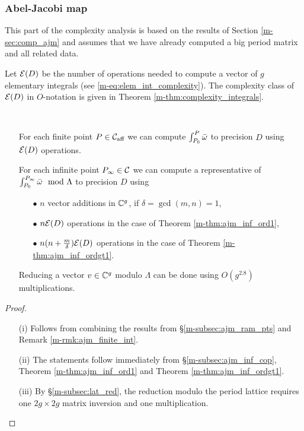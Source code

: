 \documentclass[main.tex]{subfiles}
\begin{document}
   \subsubsection{Abel-Jacobi map}

  This part of the complexity analysis is based on the results of Section \ref{m-sec:comp_ajm} and assumes that we have already computed a big period matrix and all related data.

  Let $\mathcal E(D)$ be the number of operations needed to compute a vector of $g$ elementary integrals  (see \eqref{m-eq:elem_int_complexity}). The complexity class of $\mathcal E(D)$ in $O$-notation is given in
  Theorem \ref{m-thm:complexity_integrals}.

   \begin{thm} \
   \begin{itemize}
     \item[{\upshape{(i)}}] For each finite point $P \in \mathcal{C}_{\text{aff}}$ we can compute $\int_{P_0}^P \bar{\omega}$ to precision $D$ using
      $\mathcal E(D)$ operations.
     \item[{\upshape{(ii)}}] For each infinite point $P_{\infty} \in \mathcal{C}$ we can compute a representative of $\int_{P_0}^{P_{\infty}} \bar{\omega} \mod \Lambda$ to precision $D$ using
      \begin{itemize}
       \item[$\bullet$] $n$ vector additions in $\mathbb{C}^g$, if $\delta = \gcd(m,n) = 1$,
       \item[$\bullet$] $n \mathcal E(D)$ operations in the case of Theorem \ref{m-thm:ajm_inf_ord1},
       \item[$\bullet$] $n(n+\frac{m}\delta)\mathcal E(D)$ operations  in the case of Theorem \ref{m-thm:ajm_inf_ordgt1}.
      \end{itemize}
      \item[{\upshape{(iii)}}] Reducing a vector $v \in \mathbb{C}^g$ modulo $\Lambda$ can be done using $O(g^{2.8})$ multiplications.
    \end{itemize}
  \end{thm}
   \begin{proof}
    \begin{itemize}
     \item[(i)] Follows from combining the results from \S \ref{m-subsec:ajm_ram_pts} and Remark \ref{m-rmk:ajm_finite_int}.
     \item[(ii)] The statements follow immediately from \S \ref{m-subsec:ajm_inf_cop}, Theorem \ref{m-thm:ajm_inf_ord1} and Theorem \ref{m-thm:ajm_inf_ordgt1}.
     \item[(iii)] By \S \ref{m-subsec:lat_red}, the reduction modulo the period lattice requires one $2g \times 2g$ matrix inversion and one multiplication.
    \end{itemize}
   \end{proof}
\end{document}
